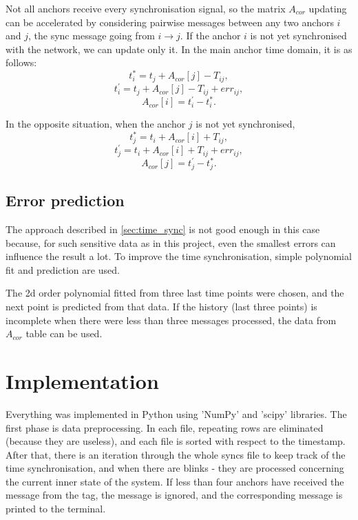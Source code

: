 \documentclass[journal]{IEEEtran}
\begin{document}
Not all anchors receive every synchronisation signal, so the matrix $A_{cor}$ updating can be accelerated by considering pairwise messages between any two anchors $i$ and $j$, the sync message going from $i \rightarrow j$. If the anchor $i$ is not yet synchronised with the network, we can update only it. In the main anchor time domain, it is as follows:
\begin{equation}
    t_i^{*} = t_j + A_{cor}[j] - T_{ij},
\end{equation}
\begin{equation}
    t_i^{'} = t_j + A_{cor}[j] - T_{ij} + err_{ij},
\end{equation}
\begin{equation}
    A_{cor}[i] = t_i^{'} - t_i^{*}.
\end{equation}

In the opposite situation, when the anchor $j$ is not yet synchronised,
\begin{equation}
    t_j^{*} = t_i + A_{cor}[i] + T_{ij},
\end{equation}
\begin{equation}
    t_j^{'} = t_i + A_{cor}[i] + T_{ij} + err_{ij},
\end{equation}
\begin{equation}
    A_{cor}[j] = t_j^{'} - t_j^{*}.
\end{equation}

\subsection{Error prediction}
\label{sec:time_sync2}
The approach described in \autoref{sec:time_sync} is not good enough in this case because, for such sensitive data as in this project, even the smallest errors can influence the result a lot.
To improve the time synchronisation, simple polynomial fit and prediction are used.

The 2d order polynomial fitted from three last time points were chosen, and the next point is predicted from that data.
If the history (last three points) is incomplete when there were less than three messages processed, the data from $A_{cor}$ table can be used.
\section{Implementation}

Everything was implemented in Python using 'NumPy' and 'scipy' libraries.
The first phase is data preprocessing. 
In each file, repeating rows are eliminated (because they are useless), and each file is sorted with respect to the timestamp.
After that, there is an iteration through the whole syncs file to keep track of the time synchronisation, and when there are blinks - they are processed concerning the current inner state of the system.
If less than four anchors have received the message from the tag, the message is ignored, and the corresponding message is printed to the terminal.
\end{document}
